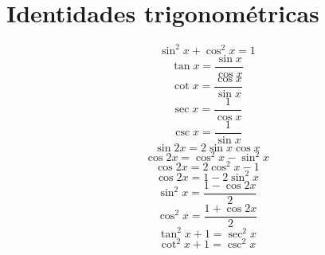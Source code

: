 \documentclass[a4paper,12pt,numbers=noenddot]{scrreprt}
\begin{document}
    \section*{Identidades trigonométricas}
    \begin{multicols}{3}
        \begin{equation*}
            \sin^2 x + \cos^2 x = 1
        \end{equation*}
        \begin{equation*}
            \tan x = \frac{\sin x}{\cos x}
        \end{equation*}
        \begin{equation*}
            \cot x = \frac{\cos x}{\sin x}
        \end{equation*}
        \begin{equation*}
            \sec x = \frac{1}{\cos x}
        \end{equation*}
        \begin{equation*}
            \csc x = \frac{1}{\sin x}
        \end{equation*}
        \begin{equation*}
            \sin 2x = 2 \sin x \cos x
        \end{equation*}
        \begin{equation*}
            \cos 2x = \cos^2 x - \sin^2 x
        \end{equation*}
        \begin{equation*}
            \cos 2x = 2 \cos^2 x - 1
        \end{equation*}
        \begin{equation*}
            \cos 2x = 1 - 2 \sin^2 x
        \end{equation*}
        \begin{equation*}
            \sin^2 x = \frac{1 - \cos 2x}{2}
        \end{equation*}
        \begin{equation*}
            \cos^2 x = \frac{1 + \cos 2x}{2}
        \end{equation*}
        \begin{equation*}
        \tan^2 x +1 = \sec^2 x
        \end{equation*}
        \begin{equation*}
            \cot^2 x + 1 = \csc^2 x
        \end{equation*}
    \end{multicols}
\end{document}
